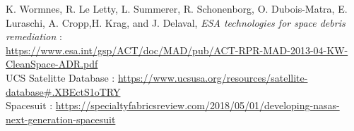 \documentclass[a4paper,1pt]{article}
\begin{document}
\begin{thebibliography}{11}
	K. Wormnes, R. Le Letty, L. Summerer, R. Schonenborg, O. Dubois-Matra, E. Luraschi, A. Cropp,H. Krag, and J. Delaval, \textit{ESA technologies for space debris remediation} :\\
	\url{https://www.esa.int/gsp/ACT/doc/MAD/pub/ACT-RPR-MAD-2013-04-KW-CleanSpace-ADR.pdf}\\
	
	UCS Satelitte Database : \url{https://www.ucsusa.org/resources/satellite-database#.XBEctS1oTRY}\\

	Spacesuit : \url{https://specialtyfabricsreview.com/2018/05/01/developing-nasas-next-generation-spacesuit}
	
\end{thebibliography}
\end{document}
